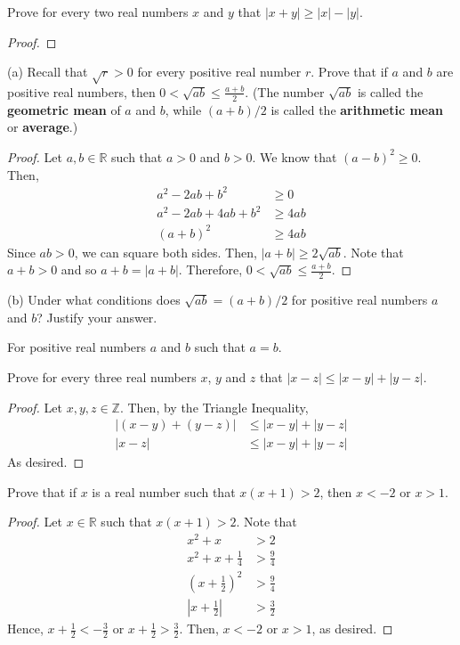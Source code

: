 \documentclass[12pt]{article}
\newcommand{\Z}{\mathbb{Z}}
\newcommand{\R}{\mathbb{R}}
\newenvironment{problem}[2][Problem]{\begin{trivlist}
		\item[\hskip \labelsep {\bfseries #1}\hskip \labelsep {\bfseries #2.}]}{\end{trivlist}}
\newenvironment{solution}[2][Solution]{\begin{trivlist}
		\item[\hskip \labelsep {\bfseries #1}\hskip \labelsep {\bfseries #2.}]}{\end{trivlist}}
\begin{document}
	\begin{problem}{31}
		Prove for every two real numbers $x$ and $y$ that $|x+y|\geq |x|-|y|$.
		\begin{proof}
		
		\end{proof}
	\end{problem}
	
	\begin{problem}{32}
		(a) Recall that $\sqrt{r}>0$ for every positive real number $r$. Prove that if $a$ and $b$ are positive real numbers, then $0<\sqrt{ab}\leq \frac{a+b}{2}$. (The number $\sqrt{ab}$ is called the \textbf{geometric mean} of $a$ and $b$, while $(a+b)/2$ is called the \textbf{arithmetic mean} or \textbf{average}.)
		\begin{proof} 
			Let $a,b \in \R$ such that $a>0$ and $b>0$. We know that $(a-b)^{2} \geq 0$. Then,
			\begin{align*}
				a^{2}-2ab+b^{2} &\geq 0 \\
				a^{2}-2ab+4ab+b^{2} &\geq 4ab\\
				(a+b)^{2} &\geq 4ab
			\end{align*} 
		Since $ab>0$, we can square both sides. Then, $|a+b| \geq 2\sqrt{ab}$. Note that $a+b>0$ and so $a+b = |a+b|$. Therefore, $0 < \sqrt{ab} \leq \frac{a+b}{2}$.
		\end{proof}
	
		(b) Under what conditions does $\sqrt{ab} = (a+b)/2$ for positive real numbers $a$ and $b$? Justify your answer.
		\begin{solution}{b}
			For positive real numbers $a$ and $b$ such that $a=b$.
		\end{solution}
	\end{problem}
	\begin{problem}{34}
		Prove for every three real numbers $x$, $y$ and $z$ that $|x-z|\leq |x-y| + |y-z|$.
		\begin{proof}
			Let $x,y,z \in \Z$. Then, by the Triangle Inequality, 
			\begin{align*}
				|(x-y)+(y-z)| &\leq |x-y| + |y-z|\\
				|x-z| &\leq |x-y| + |y-z|
			\end{align*}
		As desired.
		\end{proof}
	\end{problem}

	\begin{problem}{35}
		Prove that if $x$ is a real number such that $x(x+1)>2$, then $x<-2$ or $x>1.$
		\begin{proof}
			Let $x\in \R$ such that $x(x+1)>2$. Note that
			\begin{align*}
				x^{2}+x &> 2\\
				x^{2}+x+\frac{1}{4} &> \frac{9}{4}\\
				\left(x+\frac{1}{2}\right)^{2} &> \frac{9}{4}\\
				\left|x+\frac{1}{2}\right| &> \frac{3}{2}
			\end{align*}
		Hence, $x+\frac{1}{2} < -\frac{3}{2}$ or $x+\frac{1}{2} > \frac{3}{2}$. Then, $x < -2$ or $x > 1$, as desired.
		\end{proof}
	\end{problem}
\end{document}
